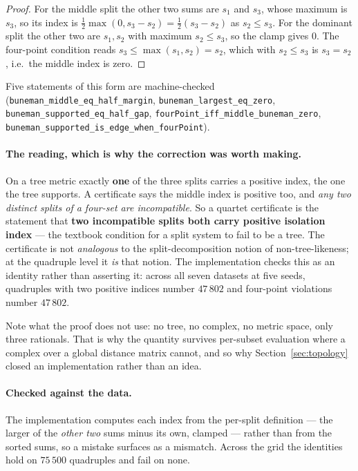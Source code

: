 \documentclass[11pt,a4paper]{article}
\theoremstyle{definition}
\theoremstyle{remark}
\begin{document}
\begin{proof}
For the middle split the other two sums are $s_1$ and $s_3$, whose maximum is
$s_3$, so its index is $\tfrac12\max(0, s_3-s_2) = \tfrac12(s_3-s_2)$ as
$s_2 \le s_3$. For the dominant split the other two are $s_1, s_2$ with maximum
$s_2 \le s_3$, so the clamp gives $0$. The four-point condition reads
$s_3 \le \max(s_1,s_2) = s_2$, which with $s_2 \le s_3$ is $s_3 = s_2$, i.e.\ the
middle index is zero.
\end{proof}

Five statements of this form are machine-checked
(\texttt{buneman\_middle\_eq\_half\_margin},
\texttt{buneman\_largest\_eq\_zero}, \texttt{buneman\_supported\_eq\_half\_gap},
\texttt{fourPoint\_iff\_middle\_buneman\_zero},
\texttt{buneman\_supported\_is\_edge\_when\_fourPoint}).

\paragraph{The reading, which is why the correction was worth making.} On a tree
metric exactly \textbf{one} of the three splits carries a positive index, the one
the tree supports. A certificate says the middle index is positive too, and
\emph{any two distinct splits of a four-set are incompatible}. So a quartet
certificate is the statement that \textbf{two incompatible splits both carry
positive isolation index} --- the textbook condition for a split system to fail
to be a tree. The certificate is not \emph{analogous} to the
split-decomposition notion of non-tree-likeness; at the quadruple level it
\emph{is} that notion. The implementation checks this as an identity rather than
asserting it: across all seven datasets at five seeds, quadruples with two
positive indices number $47\,802$ and four-point violations number $47\,802$.

Note what the proof does not use: no tree, no complex, no metric space, only
three rationals. That is why the quantity survives per-subset evaluation where a
complex over a global distance matrix cannot, and so why
Section~\ref{sec:topology} closed an implementation rather than an idea.

\paragraph{Checked against the data.} The implementation computes each index from
the per-split definition --- the larger of the \emph{other two} sums minus its
own, clamped --- rather than from the sorted sums, so a mistake surfaces as a
mismatch. Across the grid the identities hold on $75\,500$ quadruples and fail on
none.
\end{document}
